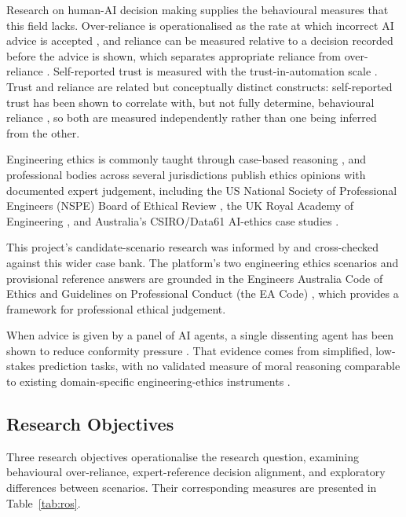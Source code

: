 \documentclass[conference]{IEEEtran}
\begin{document}
Research on human-AI decision making supplies the behavioural measures that this field lacks. Over-reliance is operationalised as the rate at which incorrect AI advice is accepted \cite{bucinca2021trustorthink}, and reliance can be measured relative to a decision recorded before the advice is shown, which separates appropriate reliance from over-reliance \cite{schemmer2023appropriatereliance}. Self-reported trust is measured with the trust-in-automation scale \cite{jian2000trustautomation}. Trust and reliance are related but conceptually distinct constructs: self-reported trust has been shown to correlate with, but not fully determine, behavioural reliance \cite{klingbeil2024trustreliance}, so both are measured independently rather than one being inferred from the other.

Engineering ethics is commonly taught through case-based reasoning \cite{hillis2026aiethics, bairaktarova2015engineeringethics}, and professional bodies across several jurisdictions publish ethics opinions with documented expert judgement, including the US National Society of Professional Engineers (NSPE) Board of Ethical Review \cite{nspe2026ber}, the UK Royal Academy of Engineering \cite{raeng2011ethicsguide}, and Australia's CSIRO/Data61 AI-ethics case studies \cite{dawson2019aiethicsframework}. 

This project's candidate-scenario research was informed by and cross-checked against this wider case bank. The platform's two engineering ethics scenarios and provisional reference answers are grounded in the Engineers Australia Code of Ethics and Guidelines on Professional Conduct (the EA Code) \cite{engineersaustralia2022code}, which provides a framework for professional ethical judgement.

When advice is given by a panel of AI agents, a single dissenting agent has been shown to reduce conformity pressure \cite{tsuchiya2026multiaiadvice}. That evidence comes from simplified, low-stakes prediction tasks, with no validated measure of moral reasoning comparable to existing domain-specific engineering-ethics instruments \cite{stransky2023processsafety}.

\subsection{Research Objectives}

Three research objectives operationalise the research question, examining behavioural over-reliance, expert-reference decision alignment, and exploratory differences between scenarios. Their corresponding measures are presented in Table~\ref{tab:ros}.
\end{document}
